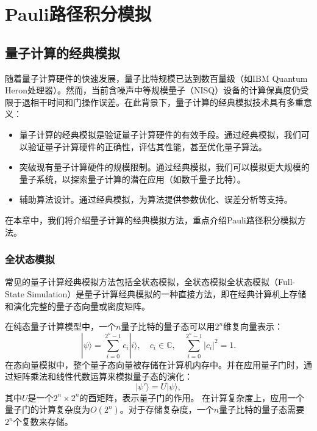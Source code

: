 \chapter{Pauli路径积分模拟}



\section{量子计算的经典模拟}
随着量子计算硬件的快速发展，量子比特规模已达到数百量级（如IBM Quantum Heron处理器）。然而，当前含噪声中等规模量子（NISQ）设备的计算保真度仍受限于退相干时间和门操作误差。在此背景下，量子计算的经典模拟技术具有多重意义：
\begin{itemize}
    \item 量子计算的经典模拟是验证量子计算硬件的有效手段。通过经典模拟，我们可以验证量子计算硬件的正确性，评估其性能，甚至优化量子算法。
    \item 突破现有量子计算硬件的规模限制。通过经典模拟，我们可以模拟更大规模的量子系统，以探索量子计算的潜在应用（如数千量子比特）。
    \item 辅助算法设计。通过经典模拟，为算法提供参数优化、误差分析等支持。
\end{itemize}
在本章中，我们将介绍量子计算的经典模拟方法，重点介绍Pauli路径积分模拟方法。


\subsection{全状态模拟}
常见的量子计算经典模拟方法包括全状态模拟，全状态模拟全状态模拟（Full-State Simulation）是量子计算经典模拟的一种直接方法，即在经典计算机上存储和演化完整的量子态向量或密度矩阵。

在纯态量子计算模型中，一个$n$量子比特的量子态可以用$2^n$维复向量表示：
\begin{equation}
    |\psi\rangle = \sum_{i=0}^{2^n-1} c_i |i\rangle,
    \quad c_i \in \mathbb{C}, \quad \sum_{i=0}^{2^n-1} |c_i|^2 = 1.
\end{equation}
在态向量模拟中，整个量子态向量被存储在计算机内存中。并在应用量子门时，通过矩阵乘法和线性代数运算来模拟量子态的演化：
\begin{equation}
    |\psi'\rangle = U |\psi\rangle,
\end{equation}
其中$U$是一个$2^n \times 2^n$的酉矩阵，表示量子门的作用。
在计算复杂度上，应用一个量子门的计算复杂度为$O(2^n)$。对于存储复杂度，一个$n$量子比特的量子态需要$2^n$个复数来存储。

